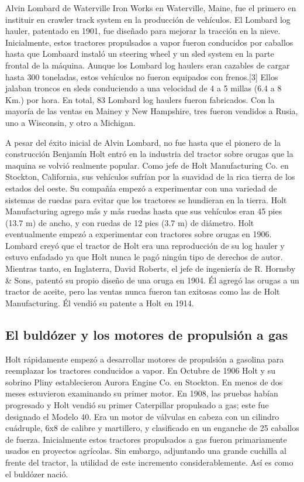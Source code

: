Alvin Lombard de Waterville Iron Works en Waterville, Maine, fue el
primero en instituir en crawler track system en la producción de
vehículos. El Lombard log hauler, patentado en 1901, fue diseñado para
mejorar la tracción en la nieve. Inicialmente, estos tractores
propulsados a vapor fueron conducidos por caballos hasta que Lombaard
instaló un steering wheel y un sled system en la parte frontal de la
máquina. Aunque los Lombard log haulers eran cazables de cargar hasta
300 toneladas, estos vehículos no fueron equipados con frenos.[3]
Ellos jalaban troncos en sleds conduciendo a una velocidad de 4 a 5
millas (6.4 a 8 Km.) por hora. En total, 83 Lombard log haulers fueron
fabricados. Con la mayoría de las ventas en Mainey y New Hampshire,
tres fueron vendidos a Rusia, uno a Wisconsin, y otro a Michigan.

A pesar del éxito inicial de Alvin Lombard, no fue hasta que el
pionero de la construcción Benjamín Holt entró en la industria del
tractor sobre orugas que la maquina se volvió realmente popular. Como
jefe de Holt Manufacturing Co. en Stockton, California, sus vehículos
sufrían por la suavidad de la rica tierra de los estados del oeste. Su
compañía empezó a experimentar con una variedad de sistemas de ruedas
para evitar que los tractores se hundieran en la tierra. Holt
Manufacturing agrego más y más ruedas hasta que sus vehículos eran 45
pies (13.7 m) de ancho, y con ruedas de 12 pies (3.7 m) de
diámetro. Holt eventualmente empezó a experimentar con tractores sobre
orugas en 1906. Lombard creyó que el tractor de Holt era una
reproducción de su log hauler y estuvo enfadado ya que Holt nunca le
pagó ningún tipo de derechos de autor. Mientras tanto, en Inglaterra,
David Roberts, el jefe de ingeniería de R. Hornsby \& Sons, patentó su
propio diseño de una oruga en 1904. Él agregó las orugas a un tractor
de aceite, pero las ventas nunca fueron tan exitosas como las de Holt
Manufacturing. Él vendió su patente a Holt en 1914.

\subsection*{El buldózer y los motores de propulsión a gas}

Holt rápidamente empezó a desarrollar motores de propulsión a gasolina
para reemplazar los tractores conducidos a vapor. En Octubre de 1906
Holt y su sobrino Pliny establecieron Aurora Engine Co. en
Stockton. En menos de dos meses estuvieron examinando su primer
motor. En 1908, las pruebas habían progresado y Holt vendió su primer
Caterpillar propulsado a gas; este fue designado el Modelo 40. Era un
motor de válvulas en cabeza con un cilindro cuádruple, 6x8 de calibre
y martillero, y clasificado en un enganche de 25 caballos de
fuerza. Inicialmente estos tractores propulsados a gas fueron
primariamente usados en proyectos agrícolas. Sin embargo, adjuntando
una grande cuchilla al frente del tractor, la utilidad de este
incremento considerablemente. Así es como el buldózer nació.


